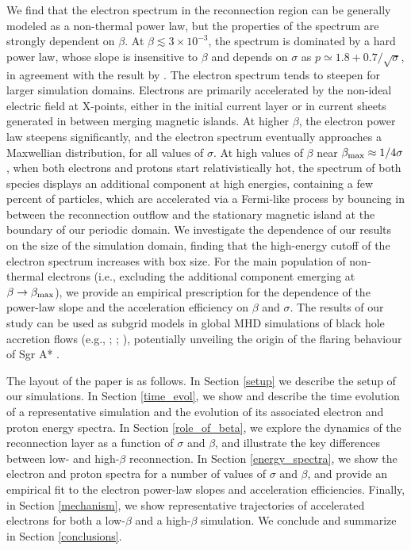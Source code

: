 We find that the electron spectrum in the reconnection region can be generally modeled as a non-thermal power law, but the properties of the spectrum are strongly dependent on $\beta$. At $\beta \lesssim 3 \times 10^{-3}$, the spectrum is dominated by a hard power law, whose slope is insensitive to $\beta$ and depends on $\sigma$ as $p\simeq 1.8 +0.7/\sqrt{\sigma}$, in agreement with the result by \citet{werner2018}. The electron spectrum tends to steepen for larger simulation domains. Electrons are primarily accelerated by the non-ideal electric field at X-points, either  in the initial current layer  or in current sheets generated in between merging magnetic islands. 
At higher $\beta$, the electron power law steepens significantly, and the electron spectrum eventually approaches a Maxwellian distribution, for all values of $\sigma$. At high values of $\beta$ near $\beta_{\rm max}\approx1/4\sigma$, when both electrons and protons start relativistically hot, the spectrum of both species displays an additional component at high energies, containing a few percent of particles, which are accelerated via a Fermi-like process by bouncing in between the reconnection outflow and the stationary magnetic island at the boundary of our periodic domain.
We investigate the dependence of our results on the size of the simulation domain, finding that  the high-energy  cutoff of the electron spectrum increases with box size. 
For the main population of non-thermal electrons (i.e., excluding the additional component emerging at $\beta\rightarrow \beta_{\rm max}$),
we provide an empirical prescription for the dependence of the power-law slope and the acceleration efficiency on $\beta$ and $\sigma$. The results of our study can be used as subgrid models in global MHD simulations of  black hole accretion flows (e.g., \citealt{ball2016}; \citealt{mao2017}; \citealt{chael2017}), potentially unveiling the origin of the flaring behaviour of Sgr A* \citep{ponti17}.

The layout of the paper is as follows.  In Section \ref{setup} we describe the setup of our simulations.  In Section \ref{time_evol}, we show and describe the time evolution of a representative simulation and the evolution of its associated electron and proton energy spectra.  In Section \ref{role_of_beta}, we explore the dynamics of the reconnection layer as a function of $\sigma$ and $\beta$, and illustrate the key differences between low- and high-$\beta$ reconnection.  In Section \ref{energy_spectra}, we show the electron and proton spectra for a number of values of $\sigma$ and $\beta$, and provide an empirical fit to the electron power-law slopes and acceleration efficiencies.  Finally, in Section \ref{mechanism}, we show representative trajectories of accelerated electrons for both a low-$\beta$ and a high-$\beta$ simulation.  We conclude and summarize in Section \ref{conclusions}.


